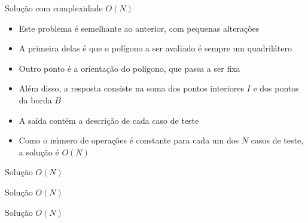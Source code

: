 \begin{frame}[fragile]{Solução com complexidade $O(N)$}

    \begin{itemize}
        \item Este problema é semelhante ao anterior, com pequenas alterações
        \pause

        \item A primeira delas é que o polígono a ser avaliado é sempre um quadrilátero
        \pause

        \item Outro ponto é a orientação do polígono, que passa a ser fixa 
        \pause

        \item Além disso, a resposta consiste na soma dos pontos interiores $I$ e dos pontos
            da borda $B$
        \pause

        \item A saída contém a descrição de cada caso de teste
        \pause

        \item Como o número de operações é constante para cada um dos $N$ casos de teste,
            a solução é $O(N)$
   \end{itemize}

\end{frame}

\begin{frame}[fragile]{Solução $O(N)$}
\end{frame}

\begin{frame}[fragile]{Solução $O(N)$}
\end{frame}

\begin{frame}[fragile]{Solução $O(N)$}
\end{frame}

